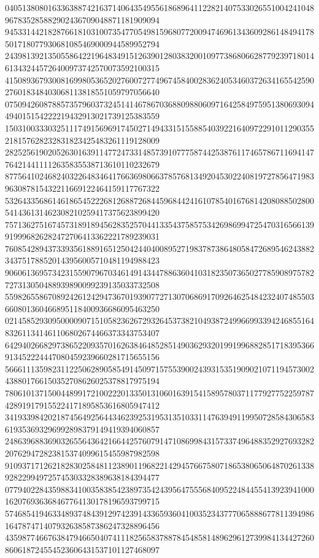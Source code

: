 \begin{DoxyCode}
      040513808016336388742163714064354955618689641122821407533026551004241048967835285882902436709048871181909094
      945331442182876618103100735477054981596807720094746961343609286148494178501718077930681085469000944589952794
      243981392135055864221964834915126390128038320010977386806628779239718014613432445726400973742570073592100315
      415089367930081699805365202760072774967458400283624053460372634165542590276018348403068113818551059797056640
      075094260878857357960373245141467867036880988060971642584975951380693094494015154222219432913021739125383559
      150310033303251117491569691745027149433151558854039221640972291011290355218157628232831823425483261119128009
      282525619020526301639114772473314857391077758744253876117465786711694147764214411112635835538713610110232679
      877564102468240322648346417663698066378576813492045302240819727856471983963087815432211669122464159117767322
      532643356861461865452226812688726844596844241610785401676814208088502800541436131462308210259417375623899420
      757136275167457318918945628352570441335437585753426986994725470316566139919996826282472706413362221789239031
      760854289437339356188916512504244040089527198378738648058472689546243882343751788520143956005710481194988423
      906061369573423155907967034614914344788636041031823507365027785908975782727313050488939890099239135033732508
      559826558670892426124294736701939077271307068691709264625484232407485503660801360466895118400936686095463250
      021458529309500009071510582362672932645373821049387249966993394246855164832611341461106802674466373343753407
      642940266829738652209357016263846485285149036293201991996882851718395366913452224447080459239660281715655156
      566611135982311225062890585491450971575539002439315351909021071194573002438801766150352708626025378817975194
      780610137150044899172100222013350131060163915415895780371177927752259787428919179155224171895853616805947412
      341933984202187456492564434623925319531351033114763949119950728584306583619353693296992898379149419394060857
      248639688369032655643642166442576079147108699843157337496488352927693282207629472823815374099615455987982598
      910937171262182830258481123890119682214294576675807186538065064870261338928229949725745303328389638184394477
      077940228435988341003583854238973542439564755568409522484455413923941000162076936368467764130178196593799715
      574685419463348937484391297423914336593604100352343777065888677811394986164787471407932638587386247328896456
      435987746676384794665040741118256583788784548581489629612739984134427260860618724554523606431537101127468097

\end{DoxyCode}
